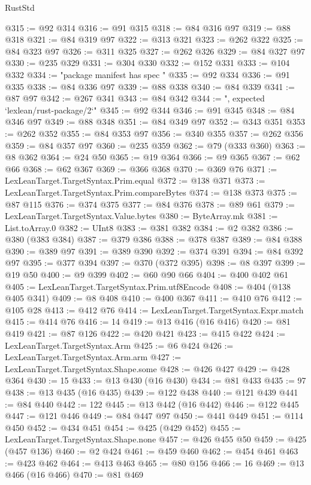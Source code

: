 \begin{lexlean}{RustStd}
\begin{coremodule}
{\begin{coremodule}
{{{{{{{{{{{{{{{{{{{{{{{{{{{{{{{{{{{{{{{{{{{{{{{{{{{{{{@315 := @92 @314
@316 := @91 @315
@318 := @84 @316 @97
@319 := @88 @318
@321 := @84 @319 @97
@322 := @313 @321
@323 := @262 @322
@325 := @84 @323 @97
@326 := @311 @325
@327 := @262 @326
@329 := @84 @327 @97
@330 := @235 @329
@331 := @304 @330
@332 := @152 @331
@333 := @104 @332
@334 := "package manifest has spec "
@335 := @92 @334
@336 := @91 @335
@338 := @84 @336 @97
@339 := @88 @338
@340 := @84 @339
@341 := @87 @97
@342 := @267 @341
@343 := @84 @342
@344 := ", expected `lexlean/rust-package/2`"
@345 := @92 @344
@346 := @91 @345
@348 := @84 @346 @97
@349 := @88 @348
@351 := @84 @349 @97
@352 := @343 @351
@353 := @262 @352
@355 := @84 @353 @97
@356 := @340 @355
@357 := @262 @356
@359 := @84 @357 @97
@360 := @235 @359
@362 := @79 (@333 @360)
@363 := @8 @362
@364 := @24 @50
@365 := @19 @364
@366 := @9 @365
@367 := @62 @66
@368 := @62 @367
@369 := @366 @368
@370 := @369 @76
@371 := LexLeanTarget.TargetSyntax.Prim.equal
@372 := @138 @371
@373 := LexLeanTarget.TargetSyntax.Prim.compareBytes
@374 := @138 @373
@375 := @87 @115
@376 := @374 @375
@377 := @84 @376
@378 := @89 @61
@379 := LexLeanTarget.TargetSyntax.Value.bytes
@380 := ByteArray.mk
@381 := List.toArray.{0}
@382 := UInt8
@383 := @381 @382
@384 := @2 @382
@386 := @380 (@383 @384)
@387 := @379 @386
@388 := @378 @387
@389 := @84 @388
@390 := @389 @97
@391 := @389 @390
@392 := @374 @391
@394 := @84 @392 @97
@395 := @377 @394
@397 := @370 (@372 @395)
@398 := @8 @397
@399 := @19 @50
@400 := @9 @399
@402 := @60 @90 @66
@404 := @400 @402 @61
@405 := LexLeanTarget.TargetSyntax.Prim.utf8Encode
@408 := @404 (@138 @405 @341)
@409 := @8 @408
@410 := @400 @367
@411 := @410 @76
@412 := @105 @28
@413 := @412 @76
@414 := LexLeanTarget.TargetSyntax.Expr.match
@415 := @414 @76
@416 := 14
@419 := @13 @416 (@16 @416)
@420 := @81 @419
@421 := @87 @126
@422 := @420 @421
@423 := @415 @422
@424 := LexLeanTarget.TargetSyntax.Arm
@425 := @6 @424
@426 := LexLeanTarget.TargetSyntax.Arm.arm
@427 := LexLeanTarget.TargetSyntax.Shape.some
@428 := @426 @427
@429 := @428 @364
@430 := 15
@433 := @13 @430 (@16 @430)
@434 := @81 @433
@435 := 97
@438 := @13 @435 (@16 @435)
@439 := @122 @438
@440 := @121 @439
@441 := @84 @440
@442 := 122
@445 := @13 @442 (@16 @442)
@446 := @122 @445
@447 := @121 @446
@449 := @84 @447 @97
@450 := @441 @449
@451 := @114 @450
@452 := @434 @451
@454 := @425 (@429 @452)
@455 := LexLeanTarget.TargetSyntax.Shape.none
@457 := @426 @455 @50
@459 := @425 (@457 @136)
@460 := @2 @424
@461 := @459 @460
@462 := @454 @461
@463 := @423 @462
@464 := @413 @463
@465 := @80 @156
@466 := 16
@469 := @13 @466 (@16 @466)
@470 := @81 @469
}}}}}}}}}}}}}}}}}}}}}}}}}}}}}}}}}}}}}}}}}}}}}}}}}}}}}}
\end{coremodule}}
\end{coremodule}
\end{lexlean}

